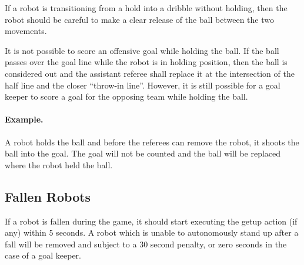 \documentclass[12pt]{article}
\begin{document}
If a robot is transitioning from a hold into a dribble without holding,
then the robot should be careful to make a clear release of the ball
between the two movements.

It is not possible to score an offensive goal while holding the ball.  If the ball passes over the goal line while the robot is in holding position, then the ball is considered out
and the assistant referee shall replace it at the intersection of the
half line and the closer ``throw-in line''. However, it is still possible for a goal keeper to score a goal for the opposing team
while holding the ball.

\paragraph{Example.} A robot holds the ball and before the referees
can remove the robot, it shoots the ball into the goal.  The goal
will not be counted and the ball will be replaced where the robot
held the ball.

\subsection{Fallen Robots}
\label{sec:fallenrobots}

If a robot is fallen during the game, it should start executing the getup action (if any) within 5 seconds. A robot which is unable to autonomously stand up after a fall will be removed and subject to a 30 second penalty, or zero seconds in the case of a goal keeper.

%
\end{document}

